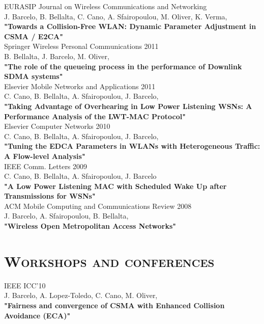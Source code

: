 \documentclass[line,margin]{res}
\begin{document}
\begin{resume}
\hfill {EURASIP Journal on Wireless Communications and Networking} \\
J. Barcelo, B. Bellalta, C. Cano, A. Sfairopoulou, M. Oliver, K. Verma,\\
\textbf{"Towards a Collision-Free WLAN: Dynamic Parameter Adjustment in CSMA / E2CA"}\\

\hfill {Springer Wireless Personal Communications 2011} \\
B. Bellalta, J. Barcelo, M. Oliver,\\
\textbf{"The role of the queueing process in the performance of Downlink SDMA systems"}\\

\hfill {Elsevier Mobile Networks and Applications 2011} \\
C. Cano, B. Bellalta, A. Sfairopoulou, J. Barcelo,\\
\textbf{"Taking Advantage of Overhearing in Low Power Listening WSNs: A Performance Analysis of the LWT-MAC Protocol"}\\

\hfill {Elsevier Computer Networks 2010} \\
C. Cano, B. Bellalta, A. Sfairopoulou, J. Barcelo,\\
\textbf{"Tuning the EDCA Parameters in WLANs with Heterogeneous Traffic: A Flow-level Analysis"}\\

\hfill {IEEE Comm. Letters 2009} \\
C. Cano, B. Bellalta, A. Sfairopoulou, J. Barcelo\\
\textbf{"A Low Power Listening MAC with Scheduled Wake Up after Transmissions for WSNs"}\\

\hfill {ACM Mobile Computing and Communications Review 2008} \\
J. Barcelo, A. Sfairopoulou, B. Bellalta,\\
\textbf{"Wireless Open Metropolitan Access Networks"}\\

\section{\textsc{Workshops and conferences}}

\hfill {IEEE ICC'10} \\
J. Barcelo, A. Lopez-Toledo,  C. Cano, M. Oliver,\\
\textbf{"Fairness and convergence of CSMA with Enhanced Collision Avoidance (ECA)"}\\


\end{resume}
\end{document}
